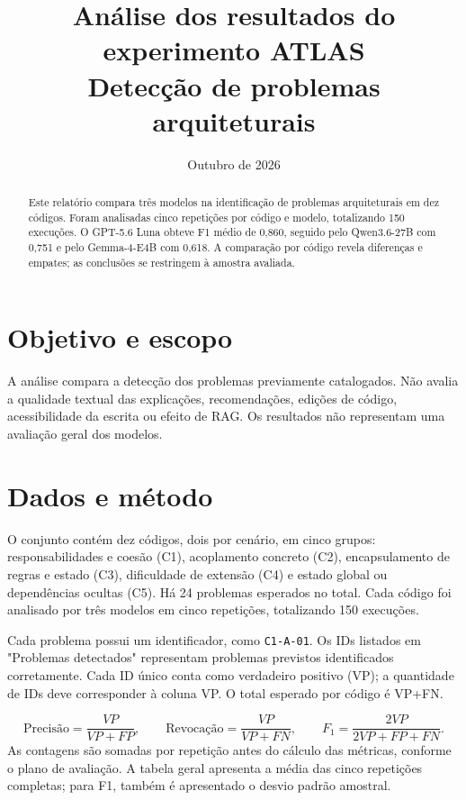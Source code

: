 \documentclass[12pt,a4paper]{article}
\title{\textbf{Análise dos resultados do experimento ATLAS}\\[0.4em]\large Detecção de problemas arquiteturais}
\author{}
\date{Outubro de 2026}
\begin{document}
\maketitle

\begin{abstract}
Este relatório compara três modelos na identificação de problemas arquiteturais em dez códigos. Foram analisadas cinco repetições por código e modelo, totalizando 150 execuções. O GPT-5.6 Luna obteve F1 médio de 0,860, seguido pelo Qwen3.6-27B com 0,751 e pelo Gemma-4-E4B com 0,618. A comparação por código revela diferenças e empates; as conclusões se restringem à amostra avaliada.
\end{abstract}

\section{Objetivo e escopo}
A análise compara a detecção dos problemas previamente catalogados. Não avalia a qualidade textual das explicações, recomendações, edições de código, acessibilidade da escrita ou efeito de RAG. Os resultados não representam uma avaliação geral dos modelos.

\section{Dados e método}
O conjunto contém dez códigos, dois por cenário, em cinco grupos: responsabilidades e coesão (C1), acoplamento concreto (C2), encapsulamento de regras e estado (C3), dificuldade de extensão (C4) e estado global ou dependências ocultas (C5). Há 24 problemas esperados no total. Cada código foi analisado por três modelos em cinco repetições, totalizando 150 execuções.

Cada problema possui um identificador, como \texttt{C1-A-01}. Os IDs listados em "Problemas detectados" representam problemas previstos identificados corretamente. Cada ID único conta como verdadeiro positivo (VP); a quantidade de IDs deve corresponder à coluna VP. O total esperado por código é VP+FN.

\[
\mathrm{Precisão}=\frac{VP}{VP+FP},\qquad
\mathrm{Revocação}=\frac{VP}{VP+FN},\qquad
F_1=\frac{2VP}{2VP+FP+FN}.
\]
As contagens são somadas por repetição antes do cálculo das métricas, conforme o plano de avaliação. A tabela geral apresenta a média das cinco repetições completas; para F1, também é apresentado o desvio padrão amostral.
\end{document}

